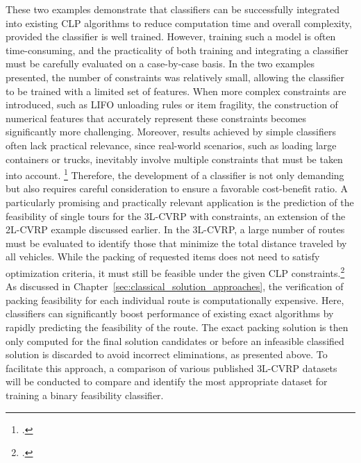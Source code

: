 These two examples demonstrate that classifiers can be successfully integrated into existing \gls{CLP}
algorithms to reduce computation time and overall complexity, provided the classifier is well trained.
However, training such a model is often time-consuming, and the practicality of both training and
integrating a classifier must be carefully evaluated on a case-by-case basis.
In the two examples presented, the number of constraints was relatively small, allowing the classifier
to be trained with a limited set of features. When more complex constraints are introduced, such as
\gls{LIFO} unloading rules or item fragility, the construction of numerical features that accurately
represent these constraints becomes significantly more challenging.
Moreover, results achieved by simple classifiers often lack practical relevance, since real-world
scenarios, such as loading large containers or trucks, inevitably involve multiple constraints that
must be taken into account. \footcite[cf.][pp. 1--2]{bischoff_issues_1995} Therefore, the development of a classifier is not only demanding but also
requires careful consideration to ensure a favorable cost-benefit ratio.
A particularly promising and practically relevant application is the prediction of the feasibility of single tours for the
\gls{3L-CVRP} with constraints, an extension of the \gls{2L-CVRP} example discussed earlier. In the
\gls{3L-CVRP}, a large number of routes must be evaluated to identify those that minimize the total
distance traveled by all vehicles. While the packing of requested items does not need to satisfy
optimization criteria, it must still be feasible under the given \gls{CLP} constraints.\footcite[cf.][]{tamke_branch-and-cut_2024}
As discussed in Chapter~\ref{sec:classical_solution_approaches}, the verification of
packing feasibility for each individual route is computationally expensive.
Here, classifiers can significantly boost performance of existing exact algorithms by rapidly predicting the feasibility of the route. The
exact packing solution is then only computed for the final solution candidates or before an infeasible classified solution
is discarded to avoid incorrect eliminations, as presented above.
To facilitate this approach, a comparison of various published \gls{3L-CVRP} datasets will be conducted
to compare and identify the most appropriate dataset for training a binary feasibility classifier.